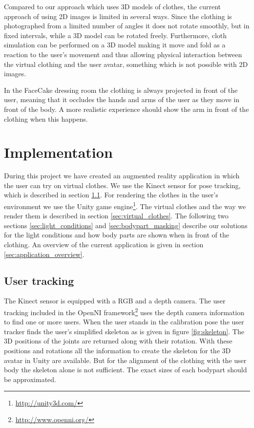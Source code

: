 \documentclass[twocolumn,a4paper]{article}
\begin{document}
Compared to our approach which uses 3D models of clothes, the current approach of using 2D images is limited in several ways. Since the clothing is photographed from a limited number of angles it does not rotate smoothly, but in fixed intervals, while a 3D model can be rotated freely. Furthermore, cloth simulation can be performed on a 3D model making it move and fold as a reaction to the user's movement and thus allowing physical interaction between the virtual clothing and the user avatar, something which is not possible with 2D images.

In the FaceCake dressing room the clothing is always projected in front of the user, meaning that it occludes the hands and arms of the user as they move in front of the body. A more realistic experience should show the arm in front of the clothing when this happens.

\section{Implementation}
\label{sec:implementation}

During this project we have created an augmented reality application in which the user can try on virtual clothes. We use the Kinect sensor for pose tracking, which is described in section \ref{sec:user_tracking}. For rendering the clothes in the user's environment we use the Unity game engine\footnote{\url{http://unity3d.com/}}. The virtual clothes and the way we render them is described in section \ref{sec:virtual_clothes}. The following two sections \ref{sec:light_conditions} and \ref{sec:bodypart_masking} describe our solutions for the light conditions and how body parts are shown when in front of the clothing. An overview of the current application is given in section \ref{sec:application_overview}.

\subsection{User tracking}
\label{sec:user_tracking}

The Kinect sensor is equipped with a RGB and a depth camera. The user tracking included in the OpenNI framework\footnote{\url{http://www.openni.org/}} uses the depth camera information to find one or more users. When the user stands in the calibration pose the user tracker finds the user's simplified skeleton as is given in figure \ref{fig:skeleton}. The 3D positions of the joints are returned along with their rotation. With these positions and rotations all the information to create the skeleton for the 3D avatar in Unity are available.  But for the alignment of the clothing with the user body the skeleton alone is not sufficient. The exact sizes of each bodypart should be approximated.
\end{document}
